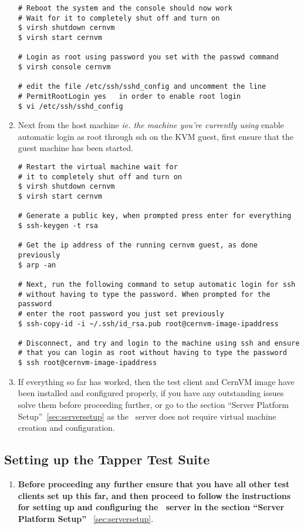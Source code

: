 \begin{enumerate}
\lstset{caption= Enable SSH Root Login}
\begin{lstlisting}
# Reboot the system and the console should now work
# Wait for it to completely shut off and turn on
$ virsh shutdown cernvm
$ virsh start cernvm

# Login as root using password you set with the passwd command
$ virsh console cernvm

# edit the file /etc/ssh/sshd_config and uncomment the line 
# PermitRootLogin yes	in order to enable root login
$ vi /etc/ssh/sshd_config
\end{lstlisting}

\item 	Next from the host machine \emph{ie. the machine you're currently using} enable automatic login as root 
		through ssh on the KVM guest, first ensure that the guest machine has been started.
\lstset{caption= Enable Automatic SSH Root Login}
\begin{lstlisting}
# Restart the virtual machine wait for 
# it to completely shut off and turn on
$ virsh shutdown cernvm
$ virsh start cernvm

# Generate a public key, when prompted press enter for everything
$ ssh-keygen -t rsa

# Get the ip address of the running cernvm guest, as done previously
$ arp -an

# Next, run the following command to setup automatic login for ssh
# without having to type the password. When prompted for the password
# enter the root password you just set previously
$ ssh-copy-id -i ~/.ssh/id_rsa.pub root@cernvm-image-ipaddress
		
# Disconnect, and try and login to the machine using ssh and ensure 
# that you can login as root without having to type the password
$ ssh root@cernvm-image-ipaddress
\end{lstlisting}

\item	If everything so far has worked, then the test client and CernVM image have been installed and configured properly,
		if you have any outstanding issues solve them before proceeding further, or go to the section ``Server Platform 		
		Setup''~\ref{sec:serversetup} as the \tapper~server does not require virtual machine creation and configuration.
\end{enumerate}

\subsection{Setting up the Tapper Test Suite}
\label{sec:debiantestsuite}
\begin{enumerate}
\item 	{\bf Before proceeding any further ensure that you have all other test clients set up this far, and then proceed
		to follow the instructions for setting up and configuring the \tapper~server in the section ``Server Platform Setup''}		
		~\ref{sec:serversetup}.
\end{enumerate}


